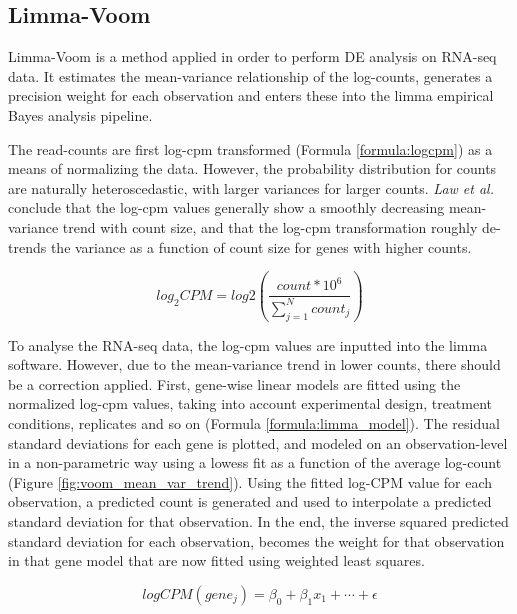 \subsection{Limma-Voom}

Limma-Voom is a method applied in order to perform DE analysis on RNA-seq data.
It estimates the mean-variance relationship of the log-counts, generates a precision weight for each observation and enters these into the limma empirical Bayes analysis pipeline.

The read-counts are first log-cpm transformed (Formula \ref{formula:logcpm}) as a means of normalizing the data.
However, the probability distribution for counts are naturally heteroscedastic, with larger variances for larger counts.
\textit{Law et al.} conclude that the log-cpm values generally show a smoothly decreasing mean-variance trend with count size, and that the log-cpm transformation roughly de-trends the variance as a function of count size for genes with higher counts.

\begin{equation}
    log_2CPM = log2\left(\frac{count * 10^6}{\sum_{j=1}^{N} count_j}\right)
    \label{formula:logcpm}
\end{equation}

To analyse the RNA-seq data, the log-cpm values are inputted into the limma software.
However, due to the mean-variance trend in lower counts, there should be a correction applied.
First, gene-wise linear models are fitted using the normalized log-cpm values, taking into account experimental design, treatment conditions, replicates and so on (Formula \ref{formula:limma_model}).
The residual standard deviations for each gene is plotted, and modeled on an observation-level in a non-parametric way using a lowess fit as a function of the average log-count (Figure \ref{fig:voom_mean_var_trend}).
Using the fitted log-CPM value for each observation, a predicted count is generated and used to interpolate a predicted standard deviation for that observation.
In the end, the inverse squared predicted standard deviation for each observation, becomes the weight for that observation in that gene model that are now fitted using weighted least squares.

\begin{equation}
    logCPM(gene_j) = \beta_0 + \beta_{1}x_{1} + \cdots + \epsilon 
    \label{formula:limma_model}
\end{equation}

